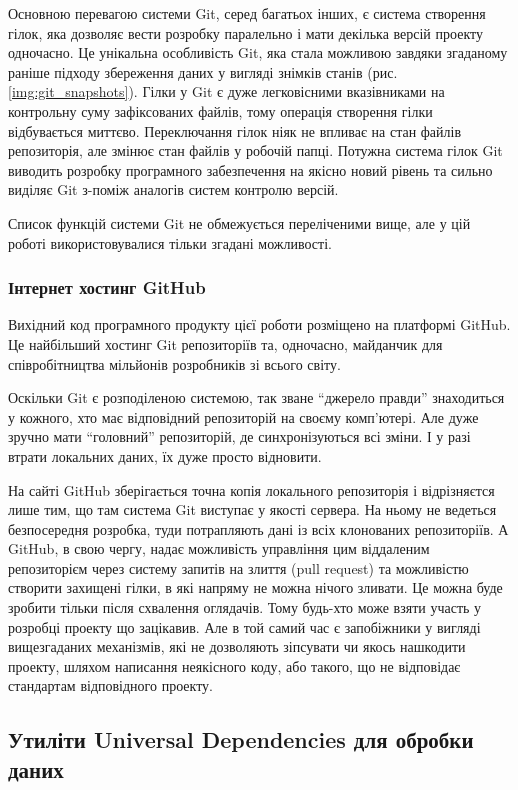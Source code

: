 Основною перевагою системи Git, серед багатьох інших, є система створення гілок, яка
дозволяє вести розробку паралельно і мати декілька версій проекту одночасно. Це унікальна
особливість Git, яка стала можливою завдяки згаданому раніше підходу збереження даних
у вигляді знімків станів (рис. \ref{img:git_snapshots}). Гілки у Git є дуже легковісними
вказівниками на контрольну суму зафіксованих файлів, тому операція створення гілки
відбувається миттєво. Переключання гілок ніяк не впливає на стан файлів репозиторія,
але змінює стан файлів у робочій папці. Потужна система гілок Git виводить розробку
програмного забезпечення на якісно новий рівень та сильно виділяє Git з-поміж аналогів
систем контролю версій.

Список функцій системи Git не обмежується переліченими вище, але у цій роботі 
використовувалися тільки згадані можливості.

\subsubsection{Інтернет хостинг GitHub}
Вихідний код програмного продукту цієї роботи розміщено на платформі GitHub.
Це найбільший хостинг Git репозиторіїв та, одночасно, майданчик для співробітництва
мільйонів розробників зі всього світу.

Оскільки Git є розподіленою системою, так зване ``джерело правди'' знаходиться у кожного,
хто має відповідний репозиторій на своєму комп'ютері. Але дуже зручно мати ``головний''
репозиторій, де синхронізуються всі зміни. І у разі втрати локальних даних, їх дуже просто
відновити.

На сайті GitHub зберігається точна копія локального репозиторія і відрізняєтся лише тим,
що там система Git виступає у якості сервера. На ньому не ведеться безпосередня розробка,
туди потрапляють дані із всіх клонованих репозиторіїв. А GitHub, в свою чергу, надає
можливість управління цим віддаленим репозиторієм через систему запитів на злиття
(pull request) та можливістю створити захищені гілки, в які напряму не можна нічого
зливати. Це можна буде зробити тільки після схвалення оглядачів. Тому будь-хто може
взяти участь у розробці проекту що зацікавив. Але в той самий час є запобіжники у
вигляді вищезгаданих механізмів, які не дозволяють зіпсувати чи якось нашкодити
проекту, шляхом написання неякісного коду, або такого, що не відповідає стандартам
відповідного проекту.

\subsection{Утиліти Universal Dependencies для обробки даних}

